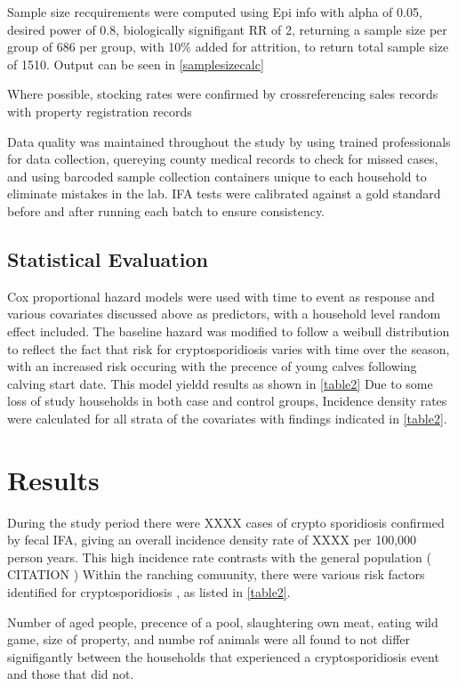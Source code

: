 \documentclass[12pt]{article}
\begin{document}
		Sample size recquirements were computed using Epi info with alpha of 0.05, desired power of 0.8, biologically signifigant RR of 2, returning a sample size per group of 686 per group, with 10\% added for attrition, to return total sample size of 1510.
		Output can be seen in \ref{samplesizecalc}

		Where possible, stocking rates were confirmed by crossreferencing sales records with property registration records
		

		Data quality was maintained throughout the study by using trained professionals for data collection, quereying county medical records to check for missed cases, and using barcoded sample collection containers unique to each household to eliminate mistakes in the lab.
		IFA tests were calibrated against a gold standard before and after running each batch to ensure consistency.

	\subsection{Statistical Evaluation}
		Cox proportional hazard models were used with time to event as response and various covariates discussed above as predictors, with a household level random effect included.
		The baseline hazard was modified to follow a weibull distribution to reflect the fact that risk for cryptosporidiosis varies with time over the season, with an increased risk occuring with the precence of young calves following calving start date. 
		This model yieldd results as shown in \ref{table2}
		Due to some loss of study households in both case and control groups, Incidence density rates were calculated for all strata of the covariates with findings indicated in \ref{table2}.



	\section{Results}
		During the study period there were XXXX cases of crypto sporidiosis confirmed by fecal IFA, giving an overall incidence density rate of XXXX per 100,000 person years. 
		This high incidence rate contrasts with the general population ( CITATION ) 
		Within the ranching comuunity, there were various risk factors identified for cryptosporidiosis , as listed in \ref{table2}. 


		Number of aged people, precence of a pool, slaughtering own meat, eating wild game, size of property, and numbe rof animals were all found to not differ signifigantly between the households that experienced a cryptosporidiosis event and those that did not. 
\end{document}
